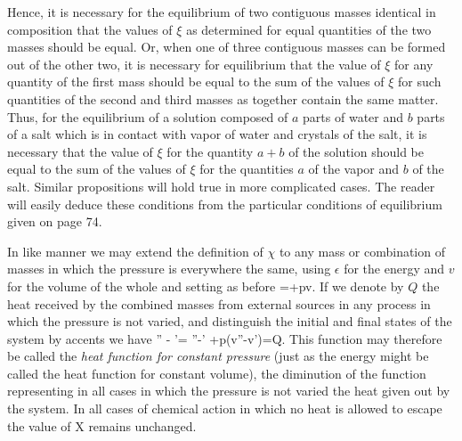 \documentclass[12pt]{article}
\begin{document}
Hence, it is necessary for the equilibrium of two contiguous masses identical in composition that the values of $\xi$ as determined for equal quantities of the two masses should be equal. Or, when one of three contiguous masses can be formed out of the other two, it is necessary for equilibrium that the value of $\xi$ for any quantity of the first mass should be equal to the sum of the values of $\xi$ for such quantities of the second and third masses as together contain the same matter. Thus, for the equilibrium of a solution composed of $a$ parts of water and $b$ parts of a salt which is in contact with vapor of water and crystals of the salt, it is necessary that the value of $\xi$ for the quantity $a+b$ of the solution should be equal to the sum of the values of $\xi$ for the quantities $a$ of the vapor and $b$ of the salt. Similar propositions will hold true in more complicated cases. The reader will easily deduce these conditions from the particular conditions of equilibrium given on page 74.


In like manner we may extend the definition of $\chi$ to any mass or combination of masses in which the pressure is everywhere the same, using $\epsilon$ for the energy and $v$ for the volume of the whole and setting as before
\eqs \chi=\epsilon+pv. \label{118}\eqe
If we denote by $Q$ the heat received by the combined masses from external sources in any process in which the pressure is not varied, and distinguish the initial and final states of the system by accents we have
\eqs \chi'' - \chi'= \epsilon''-\epsilon' +p(v''-v')=Q. \label{119}\eqe
This function may therefore be called the \textit{heat function for constant pressure} (just as the energy might be called the heat function for constant volume), the diminution of the function representing in all cases in which the pressure is not varied the heat given out by the system. In all cases of chemical action in which no heat is allowed to escape the value of X remains unchanged.
\end{document}
